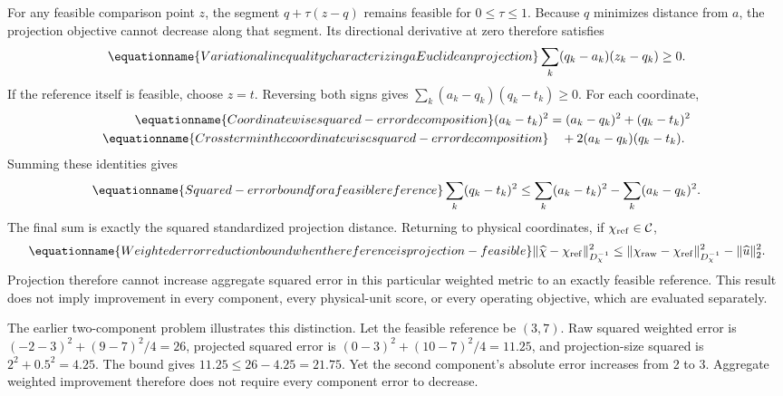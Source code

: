 For any feasible comparison point $z$, the segment $q+\tau(z-q)$ remains feasible for $0\le\tau\le1$. Because $q$ minimizes distance from $a$, the projection objective cannot decrease along that segment. Its directional derivative at zero therefore satisfies
\begin{equation}
\equationname{Variational inequality characterizing a Euclidean projection}
\sum_k(q_k-a_k)(z_k-q_k)\ge0.
\end{equation}
If the reference itself is feasible, choose $z=t$. Reversing both signs gives $\sum_k(a_k-q_k)(q_k-t_k)\ge0$. For each coordinate,
\begin{align}
\equationname{Coordinatewise squared-error decomposition}
(a_k-t_k)^2&=(a_k-q_k)^2+(q_k-t_k)^2\\
\equationname{Cross term in the coordinatewise squared-error decomposition}
&\quad+2(a_k-q_k)(q_k-t_k).
\end{align}
Summing these identities gives
\begin{equation}
\equationname{Squared-error bound for a feasible reference}
\sum_k(q_k-t_k)^2\le\sum_k(a_k-t_k)^2-\sum_k(a_k-q_k)^2.
\end{equation}
The final sum is exactly the squared standardized projection distance. Returning to physical coordinates, if $\chi_{\rm ref}\in\mathcal C$,
\begin{equation}
\equationname{Weighted error reduction bound when the reference is projection-feasible}
\|\widehat\chi-\chi_{\rm ref}\|_{D_\chi^{-1}}^2
\le\|\chi_{\rm raw}-\chi_{\rm ref}\|_{D_\chi^{-1}}^2
-\|\widehat u\|_2^2.
\label{eq:plant_projection_error_exact}
\end{equation}
Projection therefore cannot increase aggregate squared error in this particular weighted metric to an exactly feasible reference. This result does not imply improvement in every component, every physical-unit score, or every operating objective, which are evaluated separately.

The earlier two-component problem illustrates this distinction. Let the feasible reference be $(3,7)$. Raw squared weighted error is $(-2-3)^2+(9-7)^2/4=26$, projected squared error is $(0-3)^2+(10-7)^2/4=11.25$, and projection-size squared is $2^2+0.5^2=4.25$. The bound gives $11.25\le26-4.25=21.75$. Yet the second component's absolute error increases from 2 to 3. Aggregate weighted improvement therefore does not require every component error to decrease.

